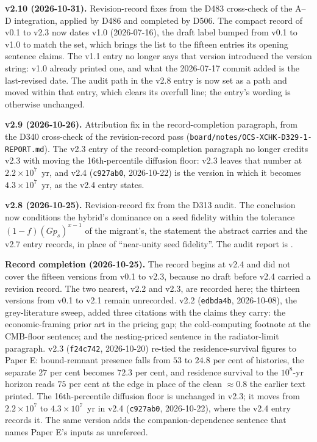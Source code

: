 \documentclass[11pt]{article}
\begin{document}
\textbf{v2.10 (2026-10-31).} Revision-record fixes from the D483 cross-check of the A--D integration, applied by D486 and completed by D506. The compact record of v0.1 to v2.3 now dates v1.0 (2026-07-16), the draft label bumped from v0.1 to v1.0 to match the set, which brings the list to the fifteen entries its opening sentence claims. The v1.1 entry no longer says that version introduced the version string: v1.0 already printed one, and what the 2026-07-17 commit added is the last-revised date. The audit path in the v2.8 entry is now set as a path and moved within that entry, which clears its overfull line; the entry's wording is otherwise unchanged.

\textbf{v2.9 (2026-10-26).} Attribution fix in the record-completion paragraph, from the D340 cross-check of the revision-record pass (\texttt{board/notes/OCS-XCHK-D329-1-REPORT.md}). The v2.3 entry of the record-completion paragraph no longer credits v2.3 with moving the 16th-percentile diffusion floor: v2.3 leaves that number at $2.2\times10^{7}$~yr, and v2.4 (\texttt{c927ab0}, 2026-10-22) is the version in which it becomes $4.3\times10^{7}$~yr, as the v2.4 entry states.

\textbf{v2.8 (2026-10-25).} Revision-record fix from the D313 audit. The conclusion now conditions the hybrid's dominance on a seed fidelity within the tolerance $(1-f)(G p_{s})^{x-1}$ of the migrant's, the statement the abstract carries and the v2.7 entry records, in place of ``near-unity seed fidelity''. The audit report is .

\textbf{Record completion (2026-10-25).} The record begins at v2.4 and did not cover the fifteen versions from v0.1 to v2.3, because no draft before v2.4 carried a revision record. The two nearest, v2.2 and v2.3, are recorded here; the thirteen versions from v0.1 to v2.1 remain unrecorded. v2.2 (\texttt{edbda4b}, 2026-10-08), the grey-literature sweep, added three citations with the claims they carry: the \citet{Hosek2007} economic-framing prior art in the pricing gap; the \citet{Garrett2026Slysh} cold-computing footnote at the CMB-floor sentence; and the \citet{Wright2023Landsberg} nesting-priced sentence in the radiator-limit paragraph. v2.3 (\texttt{f24c742}, 2026-10-20) re-tied the residence-survival figures to Paper E: bound-remnant presence falls from $53$ to $24.8$ per cent of histories, the separate $27$ per cent becomes $72.3$ per cent, and residence survival to the $10^{8}$-yr horizon reads $75$ per cent at the edge in place of the clean $\approx0.8$ the earlier text printed. The 16th-percentile diffusion floor is unchanged in v2.3; it moves from $2.2\times10^{7}$ to $4.3\times10^{7}$~yr in v2.4 (\texttt{c927ab0}, 2026-10-22), where the v2.4 entry records it. The same version adds the companion-dependence sentence that names Paper E's inputs as unrefereed.
\end{document}
